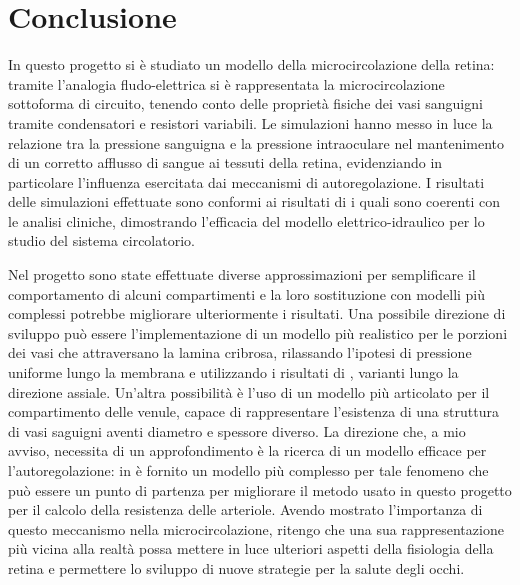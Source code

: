 \documentclass{article}
\begin{document}
\section{Conclusione}
In questo progetto si è studiato un modello della microcircolazione della retina: tramite l'analogia fludo-elettrica si è rappresentata la microcircolazione sottoforma di circuito, tenendo conto delle proprietà fisiche dei vasi sanguigni tramite condensatori e resistori variabili.
Le simulazioni hanno messo in luce la relazione tra la pressione sanguigna e la pressione intraoculare nel mantenimento di un corretto afflusso di sangue  ai tessuti della retina, evidenziando in particolare l'influenza esercitata dai meccanismi di autoregolazione.
I risultati delle simulazioni effettuate sono conformi ai risultati di \cite{art1} i quali sono coerenti con le analisi cliniche, dimostrando l'efficacia del modello elettrico-idraulico per lo studio del sistema circolatorio.

Nel progetto sono state effettuate diverse approssimazioni per semplificare il comportamento di alcuni compartimenti e la loro sostituzione con modelli più complessi potrebbe migliorare ulteriormente i risultati.
Una possibile direzione di sviluppo può essere l'implementazione di un modello più realistico per le porzioni dei vasi che attraversano la lamina cribrosa, rilassando l'ipotesi di pressione uniforme lungo la membrana e utilizzando i risultati di \cite{art3}, varianti lungo la direzione assiale.
Un'altra possibilità è l'uso di un modello più articolato per il compartimento delle venule, capace di rappresentare l'esistenza di una struttura di vasi saguigni aventi diametro e spessore diverso.
La direzione che, a mio avviso, necessita di un approfondimento è la ricerca di un modello efficace per l'autoregolazione: in \cite{Tesi} è fornito un modello più complesso per tale fenomeno che può essere un punto di partenza per migliorare il metodo usato in questo progetto per il calcolo della resistenza delle arteriole.
Avendo mostrato l'importanza di questo meccanismo nella microcircolazione, ritengo che una sua rappresentazione più vicina alla realtà possa mettere in luce ulteriori aspetti della fisiologia della retina e permettere lo sviluppo di nuove strategie per la salute degli occhi.




\end{document}
